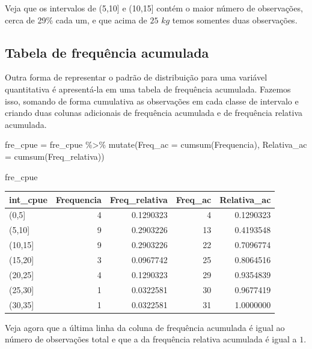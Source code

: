 \documentclass[
]{book}
\newenvironment{Shaded}{\begin{snugshade}}{\end{snugshade}}
\newcommand{\AttributeTok}[1]{\textcolor[rgb]{0.77,0.63,0.00}{#1}}
\newcommand{\FunctionTok}[1]{\textcolor[rgb]{0.00,0.00,0.00}{#1}}
\newcommand{\NormalTok}[1]{#1}
\newcommand{\OtherTok}[1]{\textcolor[rgb]{0.56,0.35,0.01}{#1}}
\newcommand{\SpecialCharTok}[1]{\textcolor[rgb]{0.00,0.00,0.00}{#1}}
\begin{document}
Veja que os intervalos de (5,10{]} e (10,15{]} contém o maior número de observações, cerca de 29\% cada um, e que acima de \(25\) \(kg\) temos somentes duas observações.

\hypertarget{tabela-de-frequuxeancia-acumulada}{%
\subsection{Tabela de frequência acumulada}\label{tabela-de-frequuxeancia-acumulada}}

Outra forma de representar o padrão de distribuição para uma variável quantitativa é apresentá-la em uma tabela de frequência acumulada. Fazemos isso, somando de forma cumulativa as observações em cada classe de intervalo e criando duas colunas adicionais de frequência acumulada e de frequência relativa acumulada.

\begin{Shaded}
\begin{Highlighting}[]
\NormalTok{fre\_cpue }\OtherTok{=}\NormalTok{ fre\_cpue }\SpecialCharTok{\%\textgreater{}\%} 
  \FunctionTok{mutate}\NormalTok{(}\AttributeTok{Freq\_ac =} \FunctionTok{cumsum}\NormalTok{(Frequencia),}
         \AttributeTok{Relativa\_ac =} \FunctionTok{cumsum}\NormalTok{(Freq\_relativa))}

\NormalTok{fre\_cpue}
\end{Highlighting}
\end{Shaded}

\begin{tabular}{l|r|r|r|r}
\hline
int\_cpue & Frequencia & Freq\_relativa & Freq\_ac & Relativa\_ac\\
\hline
(0,5] & 4 & 0.1290323 & 4 & 0.1290323\\
\hline
(5,10] & 9 & 0.2903226 & 13 & 0.4193548\\
\hline
(10,15] & 9 & 0.2903226 & 22 & 0.7096774\\
\hline
(15,20] & 3 & 0.0967742 & 25 & 0.8064516\\
\hline
(20,25] & 4 & 0.1290323 & 29 & 0.9354839\\
\hline
(25,30] & 1 & 0.0322581 & 30 & 0.9677419\\
\hline
(30,35] & 1 & 0.0322581 & 31 & 1.0000000\\
\hline
\end{tabular}

Veja agora que a última linha da coluna de frequência acumulada é igual ao número de observações total e que a da frequência relativa acumulada é igual a \(1\).
\end{document}

